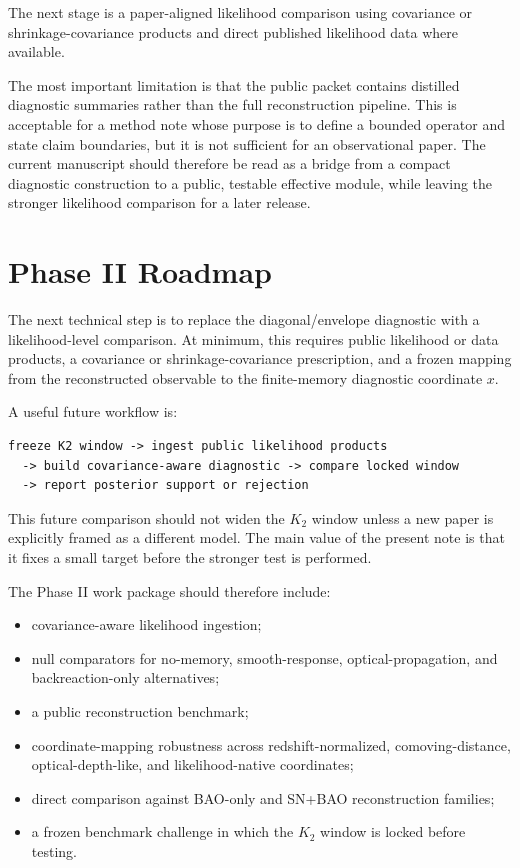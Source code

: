 \documentclass[11pt]{article}
\begin{document}
The next stage is a paper-aligned likelihood comparison using covariance or
shrinkage-covariance products and direct published likelihood data where
available.

The most important limitation is that the public packet contains distilled
diagnostic summaries rather than the full reconstruction pipeline. This is
acceptable for a method note whose purpose is to define a bounded operator and
state claim boundaries, but it is not sufficient for an observational paper.
The current manuscript should therefore be read as a bridge from a compact
diagnostic construction to a public, testable effective module, while leaving
the stronger likelihood comparison for a later release.

\section{Phase II Roadmap}

The next technical step is to replace the diagonal/envelope diagnostic with a
likelihood-level comparison. At minimum, this requires public likelihood or
data products, a covariance or shrinkage-covariance prescription, and a frozen
mapping from the reconstructed observable to the finite-memory diagnostic
coordinate $x$.

A useful future workflow is:

\begin{verbatim}
freeze K2 window -> ingest public likelihood products
  -> build covariance-aware diagnostic -> compare locked window
  -> report posterior support or rejection
\end{verbatim}

This future comparison should not widen the $K_2$ window unless a new paper is
explicitly framed as a different model. The main value of the present note is
that it fixes a small target before the stronger test is performed.

The Phase II work package should therefore include:

\begin{itemize}
\item covariance-aware likelihood ingestion;
\item null comparators for no-memory, smooth-response, optical-propagation, and backreaction-only alternatives;
\item a public reconstruction benchmark;
\item coordinate-mapping robustness across redshift-normalized, comoving-distance, optical-depth-like, and likelihood-native coordinates;
\item direct comparison against BAO-only and SN+BAO reconstruction families;
\item a frozen benchmark challenge in which the $K_2$ window is locked before testing.
\end{itemize}
\end{document}
